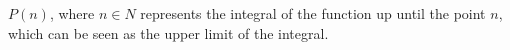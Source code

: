 $P(n)$, where $n \in N$ represents the integral of the function up until the point $n$, which can be seen as the upper limit of the integral.